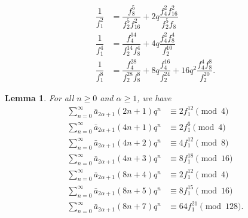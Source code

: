 \documentclass[10pt,a4paper]{amsart}
\newtheorem{lemma}{Lemma}
\begin{document}
	\begin{align}
		\dfrac{1}{f_1^2}&=\dfrac{f_8^5}{f_2^5f_{16}^2}+2q\dfrac{f_4^2f_{16}^2}{f_2^5f_8} \label{edf2}\\
		\dfrac{1}{f_1^4}&=\dfrac{f_4^{14}}{f_2^{14}f_8^4}+4q\dfrac{f_4^2f_8^4}{f_2^{10}} \label{edf4}\\
		\dfrac{1}{f_1^8}&=\dfrac{f_4^{28}}{f_2^{28}f_8^8}+8q\dfrac{f_4^{16}}{f_2^{24}}+16q^2 \dfrac{f_4^4f_8^8}{f_2^{20}} \label{edf8}.	
	\end{align}

	\begin{lemma}\label{lgf2}
		For all $n\ge0$ and $\alpha\ge 1$, we have
	\begin{align}
		\sum_{n=0}^{\infty}\bar{a}_{2\alpha+1}(2n+1)q^n&\equiv 2f_1^{12}\pmod4\label{e2no}\\
		\sum_{n=0}^{\infty}\bar{a}_{2\alpha+1}(4n+1)q^n&\equiv 2f_1^{6}\pmod4\label{e4no}\\
		\sum_{n=0}^{\infty}\bar{a}_{2\alpha+1}(4n+2)q^n&\equiv 4f_1^{12}\pmod8\label{e4n2o}\\
		\sum_{n=0}^{\infty}\bar{a}_{2\alpha+1}(4n+3)q^n&\equiv 8f_1^{18}\pmod{16}\label{e4n3o}\\
		\sum_{n=0}^{\infty}\bar{a}_{2\alpha+1}(8n+4)q^n&\equiv 2f_1^{12}\pmod4\label{e8n4o}\\
		\sum_{n=0}^{\infty}\bar{a}_{2\alpha+1}(8n+5)q^n&\equiv 8f_1^{15}\pmod{16}\label{e8n5o}\\
	\sum_{n=0}^{\infty}\bar{a}_{2\alpha+1}(8n+7)q^n&\equiv 64f_1^{21}\pmod{128}\label{e8n7o}.
	\end{align}
\end{lemma}
\end{document}
